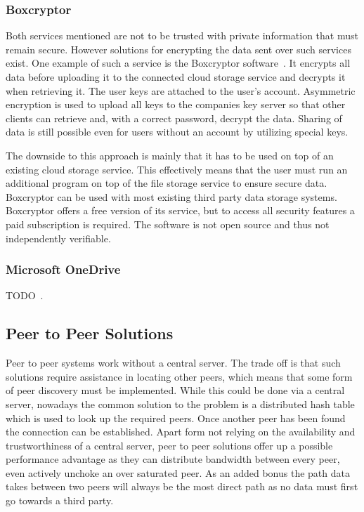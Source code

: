 \subsubsection{Boxcryptor}

Both services mentioned are not to be trusted with private information that must remain secure.
However solutions for encrypting the data sent over such services exist.
One example of such a service is the Boxcryptor software~\cite{web:site:boxcryptor}.
It encrypts all data before uploading it to the connected cloud storage service and decrypts it when retrieving it.
The user keys are attached to the user's account.
Asymmetric encryption is used to upload all keys to the companies key server so that other clients can retrieve and, with a correct password, decrypt the data.
Sharing of data is still possible even for users without an account by utilizing special keys.

The downside to this approach is mainly that it has to be used on top of an existing cloud storage service.
This effectively means that the user must run an additional program on top of the file storage service to ensure secure data.
Boxcryptor can be used with most existing third party data storage systems.
Boxcryptor offers a free version of its service, but to access all security features a paid subscription is required.
The software is not open source and thus not independently verifiable.

\subsubsection{Microsoft OneDrive}

TODO~\cite{web:site:onedrive}.

\subsection{Peer to Peer Solutions}

Peer to peer systems work without a central server.
The trade off is that such solutions require assistance in locating other peers, which means that some form of peer discovery must be implemented.
While this could be done via a central server, nowadays the common solution to the problem is a distributed hash table which is used to look up the required peers.
Once another peer has been found the connection can be established.
Apart form not relying on the availability and trustworthiness of a central server, peer to peer solutions offer up a possible performance advantage as they can distribute bandwidth between every peer, even actively unchoke an over saturated peer.
As an added bonus the path data takes between two peers will always be the most direct path as no data must first go towards a third party.


